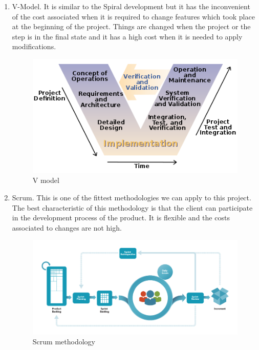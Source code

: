 \begin{enumerate}
\item V-Model. It is similar to the Spiral development but it has the inconvenient of the cost associated when it is required to change features which took place at the beginning of the project. Things are changed when the project or the step is in the final state and it has a high cost when it is needed to apply modifications.

\begin{figure}[H]
\begin{centering}
\includegraphics[scale=0.5]{IMGS/v_model.png}
\caption{V model \label{V model}}
\end{centering}
\end{figure} 

\item Scrum. This is one of the fittest methodologies we can apply to this project. The best characteristic of this methodology is that the client can participate in the development process of the product. It is flexible and the costs associated to changes are not high.

\begin{figure}[H]
\begin{centering}
\includegraphics[scale=0.5]{IMGS/Scrum.png}
\caption{Scrum methodology \label{Scrum methodology}}
\end{centering}
\end{figure} 

\end{enumerate}

